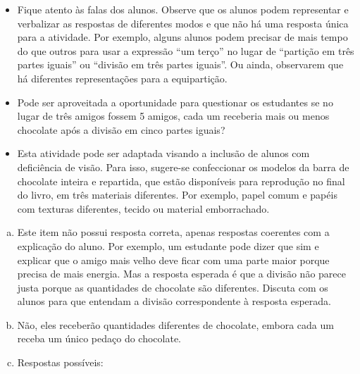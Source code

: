 \begin{multicols}{2}
\begin{orientacoes}
\begin{itemize}
    \item Fique atento às falas dos alunos. Observe que os alunos podem representar e verbalizar as respostas de diferentes modos e que não há uma resposta única para a atividade. Por exemplo, alguns alunos podem precisar de mais tempo do que outros para usar a expressão       ``um terço'' no lugar de       ``partição em três partes iguais'' ou ``divisão em três partes iguais''. Ou ainda, observarem que há diferentes representações para a equipartição.
      \item Pode ser aproveitada a oportunidade para questionar os estudantes se no lugar de três amigos fossem 5 amigos, cada um receberia mais ou menos chocolate após a divisão em cinco partes iguais? 
\end{itemize} %


\begin{itemize} %
    \item Esta atividade pode ser adaptada visando a inclusão de alunos com deficiência de visão. Para isso, sugere-se confeccionar os modelos da barra de chocolate  inteira e repartida, que estão disponíveis para reprodução no final do livro, em três materiais diferentes. Por exemplo, papel comum e papéis com texturas diferentes, tecido ou material emborrachado.
\end{itemize} %
\end{orientacoes}
\begin{solucao}{}{}
  \begin{enumerate}[a),wide,labelindent=0pt] %
    \item       Este item não possui resposta correta, apenas respostas coerentes com a explicação do aluno. Por exemplo, um estudante pode dizer que sim e explicar que o amigo mais velho deve ficar com uma parte maior porque precisa de mais energia. Mas a resposta esperada é que a divisão não parece justa porque as quantidades de chocolate são diferentes. Discuta com os alunos para que entendam a divisão correspondente à resposta esperada.
    \item Não, eles receberão quantidades diferentes de chocolate, embora cada um receba um único pedaço do chocolate.
    \item Respostas possíveis:



\end{enumerate}
\end{solucao}
\end{multicols}
